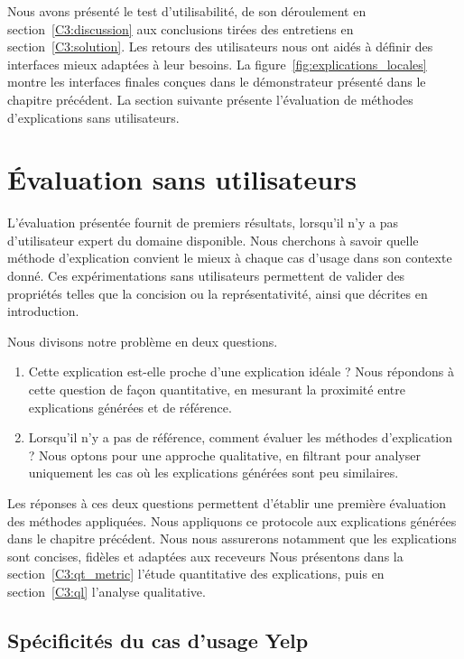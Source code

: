 Nous avons présenté le test d'utilisabilité, de son déroulement en section~\ref{C3:discussion} aux conclusions tirées des entretiens en section~\ref{C3:solution}. Les retours des utilisateurs nous ont aidés à définir des interfaces mieux adaptées à leur besoins. La figure~\ref{fig:explications_locales} montre les interfaces finales conçues dans le démonstrateur présenté dans le chapitre précédent.
La section suivante présente l'évaluation de méthodes d'explications sans utilisateurs.

\section{\'Evaluation sans utilisateurs} \label{C3:iou_expe}

L'évaluation présentée fournit de premiers résultats, lorsqu'il n'y a pas d'utilisateur expert du domaine disponible. Nous cherchons à savoir quelle méthode d'explication convient le mieux à chaque cas d'usage dans son contexte donné.
Ces expérimentations sans utilisateurs permettent de valider des propriétés telles que la concision ou la représentativité, ainsi que décrites en introduction.

Nous divisons notre problème en deux questions.
\begin{enumerate}
    \item Cette explication est-elle proche d'une explication idéale ? Nous répondons à cette question de façon quantitative, en mesurant la proximité entre explications générées et de référence.
    \item Lorsqu'il n'y a pas de référence, comment évaluer les méthodes d'explication ? Nous optons pour une approche qualitative, en filtrant pour analyser uniquement les cas où les explications générées sont peu similaires.
\end{enumerate}
Les réponses à ces deux questions permettent d'établir une première évaluation des méthodes appliquées.
Nous appliquons ce protocole aux explications générées dans le chapitre précédent.
Nous nous assurerons notamment que les explications sont concises, fidèles et adaptées aux receveurs
Nous présentons dans la section~\ref{C3:qt_metric} l'étude quantitative des explications, puis en section~\ref{C3:ql} l'analyse qualitative.

\subsection{Spécificités du cas d'usage Yelp} \label{C3:cu_yelp}

